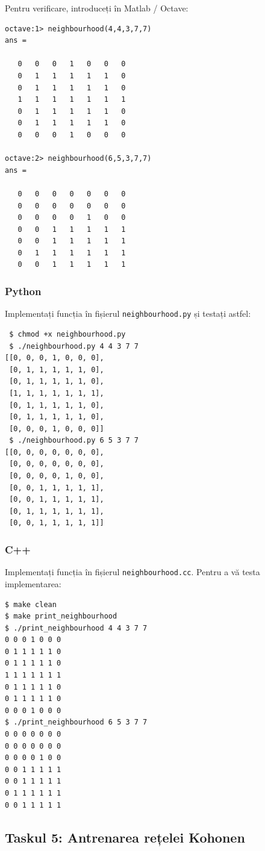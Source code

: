\documentclass[12pt]{article}%
\newcommand{\pyt}{{\color{cadmiumgreen} Python}}
\newcommand{\cc}{{\color{cobalt} C++}}
\begin{document}
Pentru verificare, introduceți în {\color{red} Matlab / Octave}:
\begin{verbatim}
octave:1> neighbourhood(4,4,3,7,7)
ans =

   0   0   0   1   0   0   0
   0   1   1   1   1   1   0
   0   1   1   1   1   1   0
   1   1   1   1   1   1   1
   0   1   1   1   1   1   0
   0   1   1   1   1   1   0
   0   0   0   1   0   0   0

octave:2> neighbourhood(6,5,3,7,7)
ans =

   0   0   0   0   0   0   0
   0   0   0   0   0   0   0
   0   0   0   0   1   0   0
   0   0   1   1   1   1   1
   0   0   1   1   1   1   1
   0   1   1   1   1   1   1
   0   0   1   1   1   1   1
\end{verbatim}


\subsubsection*{\pyt}
\label{sec:pyt4}

Implementați funcția în fișierul \texttt{neighbourhood.py} și testați
astfel:
\begin{verbatim}
 $ chmod +x neighbourhood.py
 $ ./neighbourhood.py 4 4 3 7 7
[[0, 0, 0, 1, 0, 0, 0],
 [0, 1, 1, 1, 1, 1, 0],
 [0, 1, 1, 1, 1, 1, 0],
 [1, 1, 1, 1, 1, 1, 1],
 [0, 1, 1, 1, 1, 1, 0],
 [0, 1, 1, 1, 1, 1, 0],
 [0, 0, 0, 1, 0, 0, 0]]
 $ ./neighbourhood.py 6 5 3 7 7
[[0, 0, 0, 0, 0, 0, 0],
 [0, 0, 0, 0, 0, 0, 0],
 [0, 0, 0, 0, 1, 0, 0],
 [0, 0, 1, 1, 1, 1, 1],
 [0, 0, 1, 1, 1, 1, 1],
 [0, 1, 1, 1, 1, 1, 1],
 [0, 0, 1, 1, 1, 1, 1]]
\end{verbatim}

\subsubsection*{\cc}
\label{sec:cc4}

Implementați funcția în fișierul \texttt{neighbourhood.cc}. Pentru a
vă testa implementarea:
\begin{verbatim}
$ make clean
$ make print_neighbourhood
$ ./print_neighbourhood 4 4 3 7 7
0 0 0 1 0 0 0
0 1 1 1 1 1 0
0 1 1 1 1 1 0
1 1 1 1 1 1 1
0 1 1 1 1 1 0
0 1 1 1 1 1 0
0 0 0 1 0 0 0
$ ./print_neighbourhood 6 5 3 7 7
0 0 0 0 0 0 0
0 0 0 0 0 0 0
0 0 0 0 1 0 0
0 0 1 1 1 1 1
0 0 1 1 1 1 1
0 1 1 1 1 1 1
0 0 1 1 1 1 1
\end{verbatim}

\subsection{Taskul 5: Antrenarea rețelei Kohonen}
\label{sec:task5}
\end{document}
